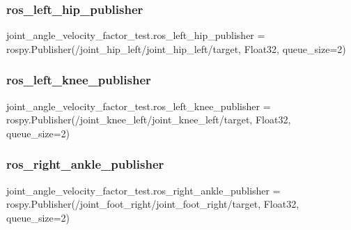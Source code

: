 \subsubsection{\texorpdfstring{ros\_left\_hip\_publisher}{ros\_left\_hip\_publisher}}
{\footnotesize\ttfamily joint\+\_\+angle\+\_\+velocity\+\_\+factor\+\_\+test.\+ros\+\_\+left\+\_\+hip\+\_\+publisher = rospy.\+Publisher(\textquotesingle{}/joint\+\_\+hip\+\_\+left/joint\+\_\+hip\+\_\+left/target\textquotesingle{}, Float32, queue\+\_\+size=2)}

\mbox{\label{namespacejoint__angle__velocity__factor__test_a16ed2bbdceab6a36b04a4a4817f2a38e}} 
\subsubsection{\texorpdfstring{ros\_left\_knee\_publisher}{ros\_left\_knee\_publisher}}
{\footnotesize\ttfamily joint\+\_\+angle\+\_\+velocity\+\_\+factor\+\_\+test.\+ros\+\_\+left\+\_\+knee\+\_\+publisher = rospy.\+Publisher(\textquotesingle{}/joint\+\_\+knee\+\_\+left/joint\+\_\+knee\+\_\+left/target\textquotesingle{}, Float32, queue\+\_\+size=2)}

\mbox{\label{namespacejoint__angle__velocity__factor__test_a9aa60022fc817fdfb6486f76c278c3fd}} 
\subsubsection{\texorpdfstring{ros\_right\_ankle\_publisher}{ros\_right\_ankle\_publisher}}
{\footnotesize\ttfamily joint\+\_\+angle\+\_\+velocity\+\_\+factor\+\_\+test.\+ros\+\_\+right\+\_\+ankle\+\_\+publisher = rospy.\+Publisher(\textquotesingle{}/joint\+\_\+foot\+\_\+right/joint\+\_\+foot\+\_\+right/target\textquotesingle{}, Float32, queue\+\_\+size=2)}

